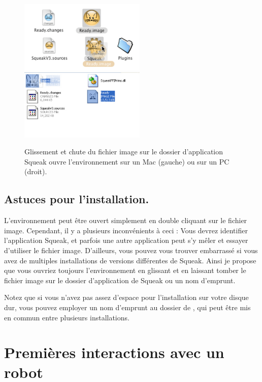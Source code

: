 \documentclass[a4paper,10pt,twoside]{book}
\begin{document}
\begin{figure}[!h]\centerline{\includegraphics[width=6cm]{5-dropImage2} \hfill{ \  } \includegraphics[width=6cm]{6-readyDD}} 
\caption{Glissement et chute du fichier image sur le dossier d'application Squeak ouvre l'environnement sur un Mac (gauche) ou sur un PC (droit).}
\end{figure}


\subsection{Astuces pour l'installation.}
L'environnement peut \^etre ouvert simplement en double cliquant sur le fichier image. Cependant, il y a plusieurs inconv\'enients \`a ceci : Vous devrez identifier l'application Squeak, et parfois une autre application peut s'y m\^eler et essayer d'utiliser le fichier image. D'ailleurs, vous pouvez vous trouver embarrass\'e si vous avez de multiples installations de versions diff\'erentes de Squeak. Ainsi je propose que vous ouvriez toujours l'environnement en glissant et en laissant tomber le fichier image sur le dossier d'application de Squeak ou un nom d'emprunt.

Notez que si vous n'avez pas assez d'espace pour l'installation sur votre disque dur, vous pouvez employer un nom d'emprunt au dossier de , qui peut \^etre mis en commun entre plusieurs installations.





\section{Premi\`eres interactions avec un robot}
\end{document}
